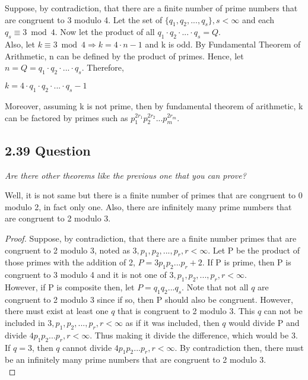 \documentclass{article}
\begin{document}
Suppose, by contradiction, that there are a finite number of prime numbers that are congruent to 3 modulo 4. Let the set of $\{q_1, q_2,...,q_s\}, s < \infty$ and each $q_s \equiv 3 \bmod 4$. Now let the product of all $q_1 \cdot q_2 \cdot ... \cdot q_s = Q$.\\
Also, let $k \equiv 3 \bmod 4 \Longrightarrow k = 4 \cdot n -1$ and k is odd. By Fundamental Theorem of Arithmetic, n can be defined by the product of primes. Hence, let $n = Q = q_1 \cdot q_2 \cdot ... \cdot q_s$. Therefore,
\begin{center}
    $k = 4 \cdot q_1 \cdot q_2 \cdot ... \cdot q_s - 1$
\end{center}
Moreover, assuming k is not prime, then by fundamental theorem of arithmetic, k can be factored by primes such as $p_{1}^{2r_1}p_{2}^{2r_2}...p_{m}^{2r_m}$.\\

\subsection*{2.39 Question} 
\quad \textit{Are there other theorems like the previous one that you can prove?}

Well, it is not same but there is a finite number of primes that are congruent to 0 modulo 2, in fact only one. Also, there are infinitely many prime numbers that are congruent to 2 modulo 3.

\begin{proof}
Suppose, by contradiction, that there are a finite number primes that are congruent to 2 modulo 3, noted as $3, p_1, p_2,...,p_r, r < \infty$. Let P be the product of those primes with the addition of 2, $P = 3p_1p_2...p_r+2$. If P is prime, then P is congruent to 3 modulo 4 and it is not one of $3, p_1, p_2,...,p_r, r < \infty$.\\ However, if P is composite then, let $P = q_1q_2...q_s$. Note that not all $q$ are congruent to 2 modulo 3 since if so, then P should also be congruent. However, there must exist at least one $q$ that is congruent to 2 modulo 3. This $q$ can not be included in $3, p_1, p_2,...,p_r, r < \infty$ as if it was included, then $q$ would divide P and divide $4p_1p_2...p_r, r < \infty$. Thus making it divide the difference, which would be 3. If $q = 3$, then $q$ cannot divide $4p_1p_2...p_r, r < \infty$. By contradiction then, there must be an infinitely many prime numbers that are congruent to 2 modulo 3.\\
\end{proof}
\end{document}
